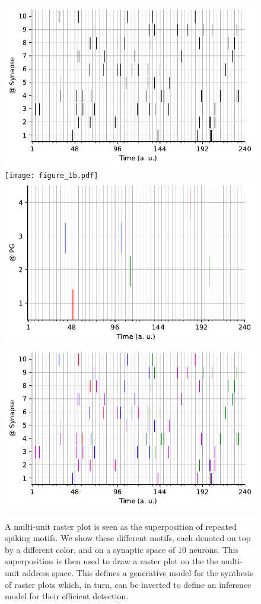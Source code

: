 \documentclass[11pt]{article}
\begin{document}
%
\begin{figure}[h!]%
    \includegraphics[width=.245\linewidth]{figure_1a_k.pdf}
    \texttt{[image: figure\_1b.pdf]}
  \includegraphics[width=.245\linewidth]{figure_1c.pdf}
    \includegraphics[width=.245\linewidth]{figure_1a.pdf}
{
\caption{A multi-unit raster plot is seen as the superposition of repeated spiking motifs. We show these different motifs, each denoted on top by a different color, and on a synaptic space of $10$ neurons. This superposition is then used to draw a raster plot on the the multi-unit address space. This defines a generative model for the synthesis of raster plots which, in turn, can be inverted to define an inference model for their efficient detection.
}
\label{fig:1}
}
\vspace{-5pt}
\end{figure}%
\end{document}
